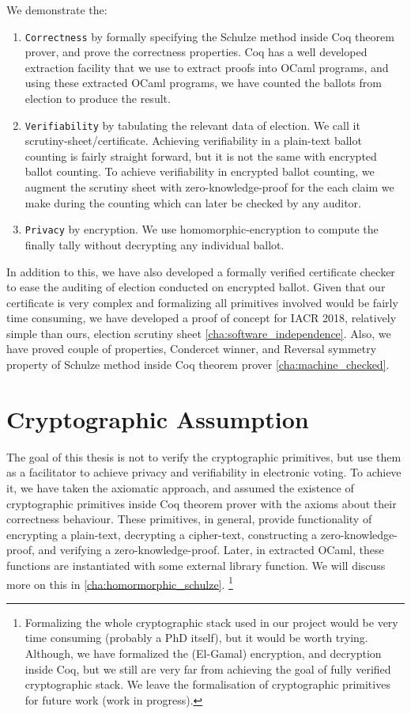 We demonstrate the:
\begin{enumerate}
 \item \texttt{Correctness} by formally specifying the Schulze method  inside 
 Coq theorem prover, and prove the correctness properties. 
 Coq has a well developed extraction facility that 
 we use to extract proofs into OCaml programs, and using these extracted OCaml programs, we 
 have counted the ballots from election to produce the result. 
 \item \texttt{Verifiability} by tabulating the relevant data of election. We call it scrutiny-sheet/certificate. 
   Achieving verifiability in a plain-text ballot counting is fairly straight forward, but it is not 
   the same with encrypted ballot counting.  To achieve verifiability in encrypted ballot counting, 
   we augment the scrutiny sheet with zero-knowledge-proof for the each claim we make during the 
   counting which can  later be checked by any auditor.  
 \item \texttt{Privacy} by encryption. We use homomorphic-encryption to compute the 
  finally tally without decrypting any individual ballot. 
\end{enumerate}


In addition to this, we have also developed a formally verified certificate checker to ease the 
auditing of election conducted on encrypted ballot.  Given that our certificate is very complex 
and formalizing all primitives involved would be fairly time consuming, we have developed a 
proof of concept for IACR 2018, relatively simple than ours, election scrutiny sheet
\ref{cha:software_independence}. 
Also, we have proved couple of properties, Condercet winner, and Reversal symmetry property 
of Schulze method inside Coq theorem prover \ref{cha:machine_checked}.

\section{Cryptographic Assumption}
The goal of this thesis is not to verify the cryptographic primitives, but use them as a 
facilitator to achieve privacy and verifiability in electronic voting. To achieve it, we have 
taken the axiomatic approach, and assumed the existence of cryptographic primitives 
inside Coq theorem prover with the 
axioms about their correctness behaviour. These primitives, in general, provide functionality 
of encrypting a plain-text, decrypting a cipher-text, constructing a zero-knowledge-proof, 
and verifying a zero-knowledge-proof. Later, in extracted OCaml, these functions are instantiated 
with some external library function.  We will discuss more on this in \ref{cha:homormorphic_schulze}.
\footnote{Formalizing the whole cryptographic stack used in our 
project would be very time consuming (probably a PhD itself), but it would be worth trying. 
Although, we have formalized the (El-Gamal) encryption, and decryption inside Coq, but we still 
are very far from achieving the goal of fully verified cryptographic stack.  We leave the formalisation 
of cryptographic primitives for future work (work in progress).}



